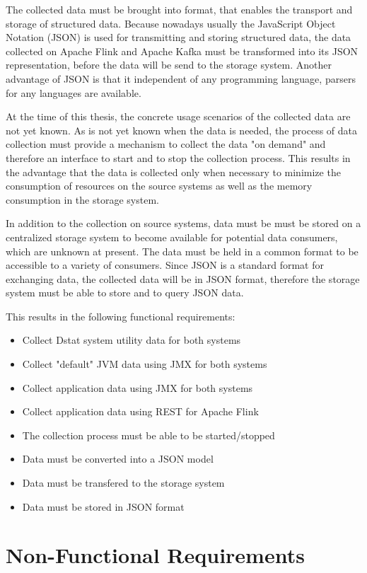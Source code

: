 The collected data must be brought into format, that enables the transport and storage of structured data.
Because nowadays usually the JavaScript Object Notation (JSON) is used for transmitting and storing
structured data, the data collected on Apache Flink and Apache Kafka must be transformed into its JSON
representation, before the data will be send to the storage system. Another advantage of JSON is
that it independent of any programming language, parsers for any languages are available.

At the time of this thesis, the concrete usage scenarios of the collected data are not yet known.
As is not yet known when the data is needed, the process of data collection must provide a mechanism
to collect the data "on demand" and therefore an interface to start and to stop the collection process.
This results in the advantage that the data is collected only when necessary to minimize the consumption
of resources on the source systems as well as the memory consumption in the storage system.

In addition to the collection on source systems, data must be must be stored on a centralized storage system
to become available for potential data consumers, which are unknown at present. The data must be held in a
common format to be accessible to a variety of consumers. Since JSON is a standard format for exchanging data,
the collected data will be in JSON format, therefore the storage system must be able to store and to query
JSON data.

This results in the following functional requirements:

\begin{itemize}
	\item Collect Dstat system utility data for both systems
	\item Collect "default" JVM data using JMX for both systems
	\item Collect application data using JMX for both systems
	\item Collect application data using REST for Apache Flink
	\item The collection process must be able to be started/stopped
	\item Data must be converted into a JSON model
	\item Data must be transfered to the storage system
	\item Data must be stored in JSON format
\end{itemize}

\section{Non-Functional Requirements}
\label{sec:nfr}

